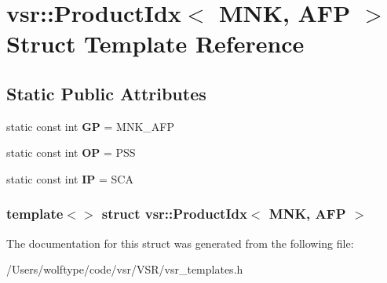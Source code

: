 \hypertarget{structvsr_1_1_product_idx_3_01_m_n_k_00_01_a_f_p_01_4}{\section{vsr\-:\-:Product\-Idx$<$ M\-N\-K, A\-F\-P $>$ Struct Template Reference}
\label{structvsr_1_1_product_idx_3_01_m_n_k_00_01_a_f_p_01_4}
}
\subsection*{Static Public Attributes}
\begin{DoxyCompactItemize}
\item 
\hypertarget{structvsr_1_1_product_idx_3_01_m_n_k_00_01_a_f_p_01_4_af9427662f14c8d05baef43954bf5e76b}{static const int {\bfseries G\-P} = M\-N\-K\-\_\-\-A\-F\-P}\label{structvsr_1_1_product_idx_3_01_m_n_k_00_01_a_f_p_01_4_af9427662f14c8d05baef43954bf5e76b}

\item 
\hypertarget{structvsr_1_1_product_idx_3_01_m_n_k_00_01_a_f_p_01_4_ac818b2e613cea79b1ff8561f0ad50c97}{static const int {\bfseries O\-P} = P\-S\-S}\label{structvsr_1_1_product_idx_3_01_m_n_k_00_01_a_f_p_01_4_ac818b2e613cea79b1ff8561f0ad50c97}

\item 
\hypertarget{structvsr_1_1_product_idx_3_01_m_n_k_00_01_a_f_p_01_4_a7c776cfe918a5dfc51a4ac03c48c94bc}{static const int {\bfseries I\-P} = S\-C\-A}\label{structvsr_1_1_product_idx_3_01_m_n_k_00_01_a_f_p_01_4_a7c776cfe918a5dfc51a4ac03c48c94bc}

\end{DoxyCompactItemize}
\subsubsection*{template$<$$>$ struct vsr\-::\-Product\-Idx$<$ M\-N\-K, A\-F\-P $>$}



The documentation for this struct was generated from the following file\-:\begin{DoxyCompactItemize}
\item 
/\-Users/wolftype/code/vsr/\-V\-S\-R/vsr\-\_\-templates.\-h\end{DoxyCompactItemize}
